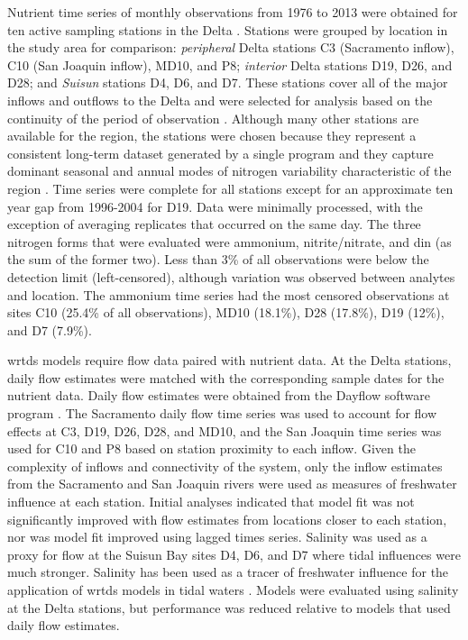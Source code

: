 \documentclass[letterpaper,12pt,oneside]{article}\usepackage[]{graphicx}\usepackage[]{color}
\begin{document}
Nutrient time series of monthly observations from 1976 to 2013 were obtained for ten active sampling stations in the Delta \citep[\cref{fig:delt_map,tab:stdescrp},][]{IEP13}.  Stations were grouped by location in the study area for comparison: \textit{peripheral} Delta stations C3 (Sacramento inflow), C10 (San Joaquin inflow), MD10, and P8; \textit{interior} Delta stations D19, D26, and D28; and \textit{Suisun} stations D4, D6, and D7.  These stations cover all of the major inflows and outflows to the Delta and were selected for analysis based on the continuity of the period of observation \citep{Jabusch09}. Although many other stations are available for the region, the stations were chosen because they represent a consistent long-term dataset generated by a single program and they capture dominant seasonal and annual modes of nitrogen variability characteristic of the region \citep{Jabusch16}. Time series were complete for all stations except for an approximate ten year gap from 1996-2004 for D19.  Data were minimally processed, with the exception of averaging replicates that occurred on the same day.  The three nitrogen forms that were evaluated were ammonium, nitrite/nitrate, and \ac{din} (as the sum of the former two). Less than 3\% of all observations were below the detection limit (left-censored), although variation was observed between analytes and location.  The ammonium time series had the most censored observations at sites C10 (25.4\% of all observations), MD10 (18.1\%), D28 (17.8\%), D19 (12\%), and D7 (7.9\%).

\ac{wrtds} models require flow data paired with nutrient data. At the Delta stations, daily flow estimates were matched with the corresponding sample dates for the nutrient data. Daily flow estimates were obtained from the Dayflow software program \citep{IEP16}.  The Sacramento daily flow time series was used to account for flow effects at C3, D19, D26, D28, and MD10, and the San Joaquin time series was used for C10 and P8 based on station proximity to each inflow. Given the complexity of inflows and connectivity of the system, only the inflow estimates from the Sacramento and San Joaquin rivers were used as measures of freshwater influence at each station.  Initial analyses indicated that model fit was not significantly improved with flow estimates from locations closer to each station, nor was model fit improved using lagged times series. Salinity was used as a proxy for flow at the Suisun Bay sites D4, D6, and D7 where tidal influences were much stronger. Salinity has been used as a tracer of freshwater influence for the application of \ac{wrtds} models in tidal waters \citep{Beck15}.  Models were evaluated using salinity at the Delta stations, but performance was reduced relative to models that used daily flow estimates. 
\end{document}
